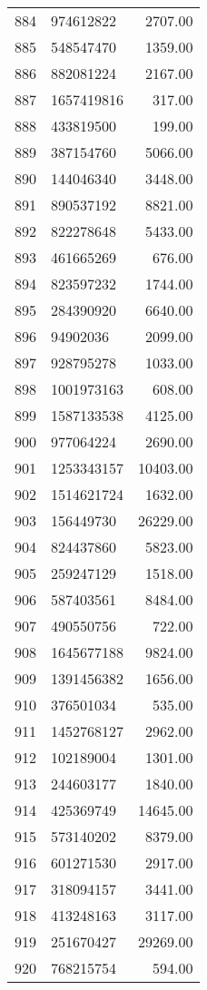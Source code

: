 \begin{table}[ht]
\begin{tabular}{rlr}
  884 & 974612822 & 2707.00 \\ 
  885 & 548547470 & 1359.00 \\ 
  886 & 882081224 & 2167.00 \\ 
  887 & 1657419816 & 317.00 \\ 
  888 & 433819500 & 199.00 \\ 
  889 & 387154760 & 5066.00 \\ 
  890 & 144046340 & 3448.00 \\ 
  891 & 890537192 & 8821.00 \\ 
  892 & 822278648 & 5433.00 \\ 
  893 & 461665269 & 676.00 \\ 
  894 & 823597232 & 1744.00 \\ 
  895 & 284390920 & 6640.00 \\ 
  896 & 94902036 & 2099.00 \\ 
  897 & 928795278 & 1033.00 \\ 
  898 & 1001973163 & 608.00 \\ 
  899 & 1587133538 & 4125.00 \\ 
  900 & 977064224 & 2690.00 \\ 
  901 & 1253343157 & 10403.00 \\ 
  902 & 1514621724 & 1632.00 \\ 
  903 & 156449730 & 26229.00 \\ 
  904 & 824437860 & 5823.00 \\ 
  905 & 259247129 & 1518.00 \\ 
  906 & 587403561 & 8484.00 \\ 
  907 & 490550756 & 722.00 \\ 
  908 & 1645677188 & 9824.00 \\ 
  909 & 1391456382 & 1656.00 \\ 
  910 & 376501034 & 535.00 \\ 
  911 & 1452768127 & 2962.00 \\ 
  912 & 102189004 & 1301.00 \\ 
  913 & 244603177 & 1840.00 \\ 
  914 & 425369749 & 14645.00 \\ 
  915 & 573140202 & 8379.00 \\ 
  916 & 601271530 & 2917.00 \\ 
  917 & 318094157 & 3441.00 \\ 
  918 & 413248163 & 3117.00 \\ 
  919 & 251670427 & 29269.00 \\ 
  920 & 768215754 & 594.00 \\ 

\end{tabular}
\end{table}
